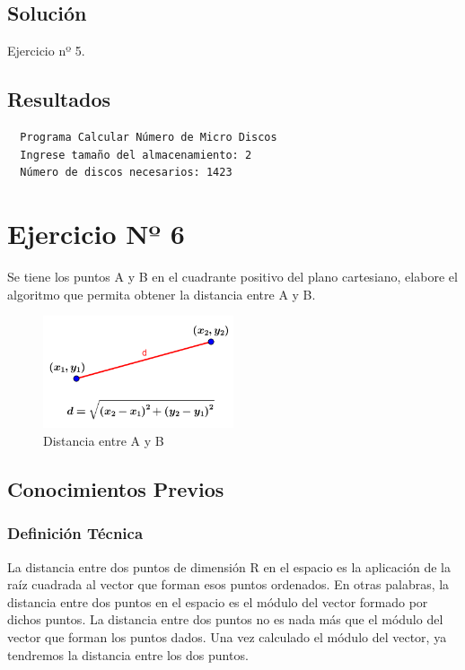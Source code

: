\subsection{Solución}
\begin{longlisting}
	\caption{Ejercicio nº 5.}\label{cod:ex_5}
\end{longlisting}
\subsection{Resultados}
\begin{verbatim}
  Programa Calcular Número de Micro Discos
  Ingrese tamaño del almacenamiento: 2
  Número de discos necesarios: 1423
\end{verbatim}
\section{Ejercicio Nº 6}
Se tiene los puntos A y B en el cuadrante positivo del plano cartesiano,
elabore el algoritmo que permita obtener la distancia entre A y B.
\begin{figure}[H]
	\centering
	\includegraphics[width=0.5\textwidth]{Images/img1.jpg}
	\caption{Distancia entre A y B}\label{fig:fg1}
\end{figure}
\subsection{Conocimientos Previos}
\subsubsection{Definición Técnica}
La distancia entre dos puntos de dimensión R en el espacio es la aplicación de
la raíz cuadrada al vector que forman esos puntos ordenados. En otras palabras,
la distancia entre dos puntos en el espacio es el módulo del vector formado por
dichos puntos. La distancia entre dos puntos no es nada más que el módulo del
vector que forman los puntos dados. Una vez calculado el módulo del vector, ya
tendremos la distancia entre los dos puntos.
